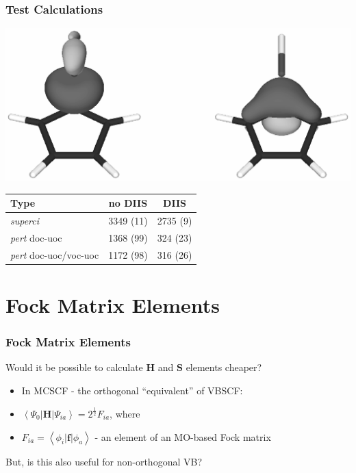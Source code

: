 \documentclass[]{beamer}
\begin{document}
\begin{frame}
  \frametitle{Test Calculations}
  \begin{center}
    \includegraphics[scale=0.5]{figures/sigma_sih.eps}  
  \end{center}
  \begin{table}
  \begin{center}
    \begin{tabular}{l c c}
      \hline
      Type & no DIIS & DIIS \\
      \hline
      \textit{superci} & 3349 (11) & 2735 (9) \\ 
      \textit{pert} doc-uoc & 1368 (99) & 324 (23)\\ 
      \textit{pert} doc-uoc/voc-uoc & 1172 (98) & 316 (26)\\
    \end{tabular}
  \end{center}
\end{table}
\end{frame}

\section{Fock Matrix Elements}

\begin{frame}
  \frametitle{Fock Matrix Elements}
  Would it be possible to calculate $\mathbf{H}$ and $\mathbf{S}$ elements cheaper?
  \vspace{15px}  
  \begin{itemize}
    \item{In MCSCF - the orthogonal ``equivalent'' of VBSCF:}
    \item{$\left< \Psi_0 | \mathbf{H} | \Psi_{ia} \right> = 2^{\frac{1}{2}}F_{ia}$, where}
    \item{$F_{ia}=\left< \phi_i | \mathbf{f} | \phi_a \right>$ - an element of an MO-based Fock matrix}
  \end{itemize}
  \vspace{15px}
  But, is this also useful for non-orthogonal VB?
\end{frame}
\end{document}
